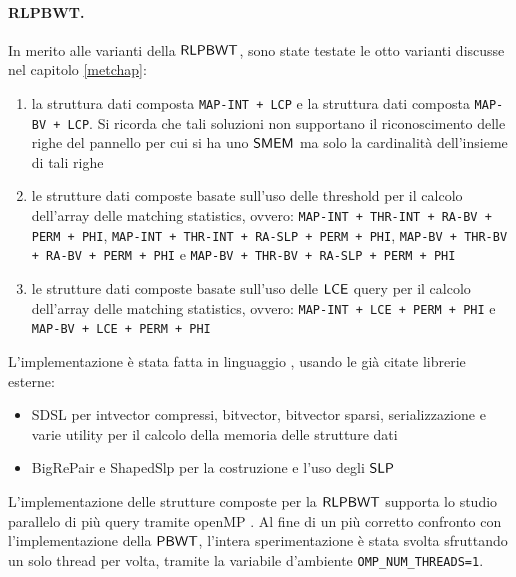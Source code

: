 \paragraph{RLPBWT.}
In merito alle varianti della $\mbox{\rm {\sf RLPBWT}}$, sono state testate le otto
varianti discusse nel capitolo \ref{metchap}:
\begin{enumerate}
  \item la struttura dati composta \texttt{MAP-INT + LCP} e la struttura dati
  composta \texttt{MAP-BV + LCP}. Si ricorda che tali soluzioni non supportano
  il riconoscimento delle righe del pannello per cui si ha uno $\mbox{\rm {\sf SMEM}}$ ma
  solo la cardinalità dell'insieme di tali righe
  \item le strutture dati composte basate sull'uso delle threshold per
  il calcolo dell'array delle matching statistics, 
  ovvero: \texttt{MAP-INT + THR-INT + RA-BV + PERM + PHI},  \texttt{MAP-INT +
    THR-INT + RA-SLP + PERM + PHI}, \texttt{MAP-BV + THR-BV + RA-BV + PERM +
    PHI} e \texttt{MAP-BV + THR-BV + RA-SLP + PERM + PHI} 
  \item le strutture dati composte basate sull'uso delle $\mbox{\rm {\sf LCE}}$ query
  per
  il calcolo dell'array delle matching statistics,
  ovvero: \texttt{MAP-INT + LCE + PERM + PHI} e \texttt{MAP-BV + LCE + PERM +
    PHI}  
\end{enumerate}
L'implementazione è stata fatta in linguaggio \Cplusplus, usando le già citate
librerie esterne:
\begin{itemize}
  \item SDSL per intvector compressi,
  bitvector, bitvector sparsi, serializzazione e varie utility
  per il calcolo della memoria delle strutture dati
  \item BigRePair e ShapedSlp per la costruzione e l'uso degli $\mbox{\rm {\sf SLP}}$ 
\end{itemize}
L'implementazione delle strutture composte per la
$\mbox{\rm {\sf RLPBWT}}$ supporta lo studio parallelo di più query tramite
openMP \cite{openmp}. Al fine di un più 
corretto confronto con l'implementazione della $\mbox{\rm {\sf PBWT}}$,
l'intera sperimentazione è stata
svolta sfruttando un solo thread per volta, tramite la variabile
d'ambiente \texttt{OMP\_NUM\_THREADS=1}.
